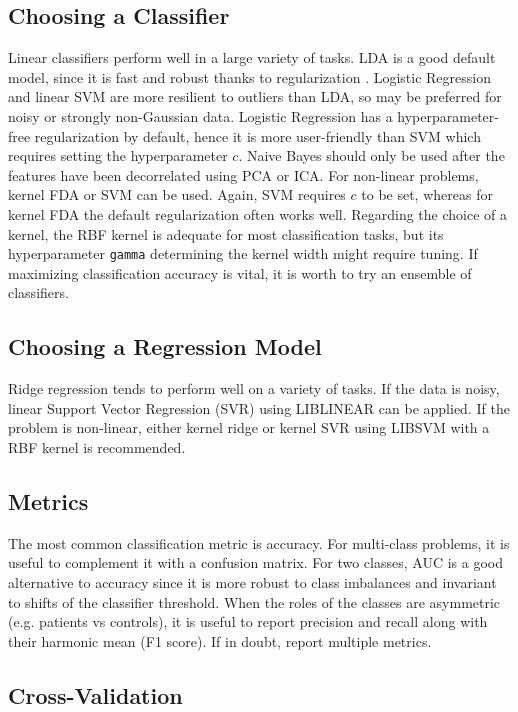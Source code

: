 \documentclass[utf8]{frontiersSCNS} %
\newcommand{\ttt}[1]{\texttt{#1}}
\begin{document}
\subsection{Choosing a Classifier} 

Linear classifiers perform well in a large variety of tasks. LDA is a good default model, since it is fast and robust thanks to regularization \citep{Blankertz2011}. Logistic Regression and linear SVM are more resilient to outliers than LDA, so may be preferred for noisy or strongly non-Gaussian data. Logistic Regression has a hyperparameter-free regularization by default, hence it is more user-friendly than SVM which requires setting the hyperparameter $c$. Naive Bayes should only be used after the features have been decorrelated using PCA or ICA. For non-linear problems, kernel FDA or SVM can be used. Again, SVM requires $c$ to be set, whereas for kernel FDA the default regularization often works well. Regarding the choice of a kernel, the RBF kernel is adequate for most classification tasks, but its hyperparameter \ttt{gamma} determining the kernel width might require tuning. If maximizing classification accuracy is vital, it is worth to try an ensemble of classifiers.

\subsection{Choosing a Regression Model}

Ridge regression tends to perform well on a variety of tasks. If the data is noisy, linear Support Vector Regression (SVR) using LIBLINEAR can be applied. If the problem is  non-linear, either kernel ridge or kernel SVR using LIBSVM with a RBF kernel is recommended.

\subsection{Metrics}

The most common classification metric is accuracy. For multi-class problems, it is useful to complement it with a confusion matrix. For two classes, AUC is a good alternative to accuracy since it is more robust to class imbalances and invariant to shifts of the classifier threshold. When the roles of the classes are asymmetric (e.g. patients vs controls), it is useful to report precision and recall along with their harmonic mean (F1 score). If in doubt, report multiple metrics.

\subsection{Cross-Validation}
\end{document}

